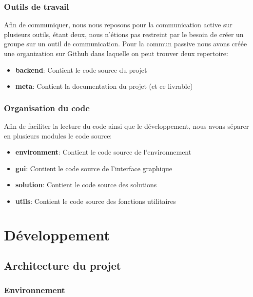 \documentclass[french,a4paper,10pt,twocolumn]{article}
\begin{document}
\subsubsection{Outils de travail}

Afin de communiquer, nous nous reposons pour la communication active sur plusieurs outils, étant deux,
nous n'étions pas restreint par le besoin de créer un groupe sur un outil de communication.
Pour la commun passive nous avons créée une organization sur Github dans laquelle on peut trouver deux repertoire:
\begin{itemize}
    \item \textbf{backend}: Contient le code source du projet
    \item \textbf{meta}: Contient la documentation du projet (et ce livrable)
\end{itemize}

\subsubsection{Organisation du code}

Afin de faciliter la lecture du code ainsi que le développement, nous avons séparer en plusieurs modules le code source:
\begin{itemize}
    \item \textbf{environment}: Contient le code source de l'environnement
    \item \textbf{gui}: Contient le code source de l'interface graphique
    \item \textbf{solution}: Contient le code source des solutions
    \item \textbf{utils}: Contient le code source des fonctions utilitaires
\end{itemize}



\section{Développement}

\subsection{Architecture du projet}

\subsubsection{Environnement}
\end{document}
